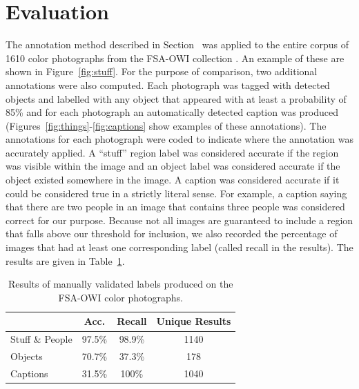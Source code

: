 \documentclass[10pt, a4paper]{article}
\newcommand{\secref}[1]{\StrSubstitute{\getrefnumber{#1}}{.}{ }}
\begin{document}
\section{Evaluation} \label{sec:eval}

The annotation method described in Section~\secref{sec:method} was applied to the
entire corpus of 1610 color photographs from the FSA-OWI collection
\cite{trachtenberg1990reading}. An example of these are shown in
Figure~\ref{fig:stuff}. For the purpose of comparison,
two additional annotations were also computed.
Each photograph was tagged with detected objects and labelled with any object
that appeared with at least a probability of 85\% and for each photograph an
automatically detected caption was produced
(Figures~\ref{fig:things}-\ref{fig:captions} show examples of these annotations).
The annotations for each photograph were coded to indicate where the annotation
was accurately applied. A ``stuff'' region label was considered accurate if the
region was visible within the image and an object label was considered
accurate if the object existed somewhere in the image. A caption was considered
accurate if it could be considered true in a strictly literal sense. For
example, a caption saying that there are two people in an image that contains
three people was considered correct for our purpose. Because not all images
are guaranteed to include a region that falls above our threshold for inclusion,
we also recorded the percentage of images that had at least one
corresponding label (called recall in the results). The results are given in
Table~\ref{tab:results}.

\begin{table}[ht!]
\centering
\begin{tabular}{lccc}
 \hline
 & \textbf{Acc.} & \textbf{Recall} & \textbf{Unique Results} \\
 \hline
Stuff \& People & 97.5\% & 98.9\% & 1140 \\
Objects & 70.7\% & 37.3\% & 178 \\
Captions & 31.5\% & 100\% & 1040 \\
  \hline
\end{tabular}
\caption{Results of manually validated labels produced on the FSA-OWI color
photographs.}
\label{tab:results}
\end{table}
\end{document}
